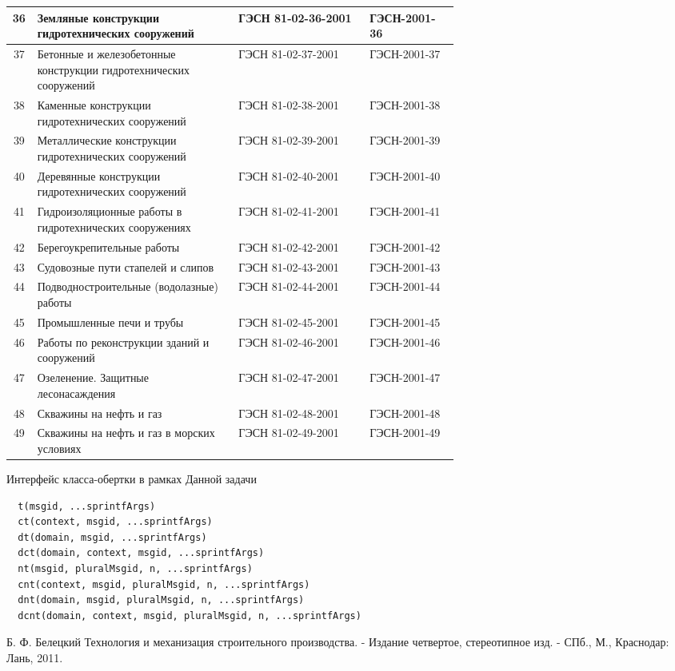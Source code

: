 \begin{longtable}{|c|p{0.45\linewidth}|l|p{0.2\linewidth}|}
  36 	& Земляные конструкции гидротехнических 
      сооружений								& ГЭСН 81-02-36-2001 	& ГЭСН-2001-36\\ \hline
  37 	& Бетонные и железобетонные конструкции 
      гидротехнических сооружений				& ГЭСН 81-02-37-2001 	& ГЭСН-2001-37\\ \hline
  38 	& Каменные конструкции гидротехнических 
      сооружений								& ГЭСН 81-02-38-2001 	& ГЭСН-2001-38\\ \hline
  39 	& Металлические конструкции 
      гидротехнических сооружений				& ГЭСН 81-02-39-2001 	& ГЭСН-2001-39\\ \hline
  40 	& Деревянные конструкции гидротехнических 
      сооружений								& ГЭСН 81-02-40-2001 	& ГЭСН-2001-40\\ \hline
  41 	& Гидроизоляционные работы в 
      гидротехнических сооружениях			& ГЭСН 81-02-41-2001 	& ГЭСН-2001-41\\ \hline
  42 	& Берегоукрепительные работы				& ГЭСН 81-02-42-2001 	& ГЭСН-2001-42\\ \hline
  43 	& Судовозные пути стапелей и слипов			& ГЭСН 81-02-43-2001 	& ГЭСН-2001-43\\ \hline
  44 	& Подводностроительные (водолазные) работы	& ГЭСН 81-02-44-2001 	& ГЭСН-2001-44\\ \hline
  45 	& Промышленные печи и трубы					& ГЭСН 81-02-45-2001 	& ГЭСН-2001-45\\ \hline
  46 	& Работы по реконструкции зданий 
      и сооружений							& ГЭСН 81-02-46-2001 	& ГЭСН-2001-46\\ \hline
  47 	& Озеленение. Защитные лесонасаждения		& ГЭСН 81-02-47-2001 	& ГЭСН-2001-47\\ \hline
  48 	& Скважины на нефть и газ					& ГЭСН 81-02-48-2001 	& ГЭСН-2001-48\\ \hline
  49 	& Скважины на нефть и газ 
      в морских условиях						& ГЭСН 81-02-49-2001 	& ГЭСН-2001-49\\ \hline
  
\end{longtable}

\begin{program}
  \caption{Интерфейс класса-обертки в рамках Данной задачи}
  \begin{verbatim}
  t(msgid, ...sprintfArgs) 
  ct(context, msgid, ...sprintfArgs)
  dt(domain, msgid, ...sprintfArgs) 
  dct(domain, context, msgid, ...sprintfArgs)
  nt(msgid, pluralMsgid, n, ...sprintfArgs)
  cnt(context, msgid, pluralMsgid, n, ...sprintfArgs)
  dnt(domain, msgid, pluralMsgid, n, ...sprintfArgs)
  dcnt(domain, context, msgid, pluralMsgid, n, ...sprintfArgs)
  \end{verbatim}
\end{program}

\begin{thebibliography}{9}
   Б. Ф. Белецкий Технология и механизация строительного производства. - Издание четвертое, стереотипное изд. - СПб., М., Краснодар: Лань, 2011.
\end{thebibliography}